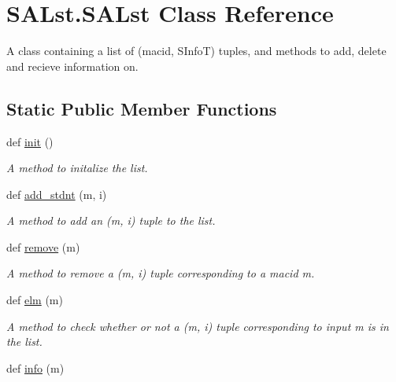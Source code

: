 \hypertarget{class_s_a_lst_1_1_s_a_lst}{}\section{S\+A\+Lst.\+S\+A\+Lst Class Reference}
\label{class_s_a_lst_1_1_s_a_lst}


A class containing a list of (\textquotesingle{}macid\textquotesingle{}, S\+InfoT) tuples, and methods to add, delete and recieve information on.  


\subsection*{Static Public Member Functions}
\begin{DoxyCompactItemize}
\item 
\mbox{\label{class_s_a_lst_1_1_s_a_lst_ac0886d79feebf875207b927b6d23a959}} 
def \mbox{\hyperlink{class_s_a_lst_1_1_s_a_lst_ac0886d79feebf875207b927b6d23a959}{init}} ()
\begin{DoxyCompactList}\small\item\em A method to initalize the list. \end{DoxyCompactList}\item 
def \mbox{\hyperlink{class_s_a_lst_1_1_s_a_lst_aa09d412a6f5562e32730d4857f7569ca}{add\+\_\+stdnt}} (m, i)
\begin{DoxyCompactList}\small\item\em A method to add an (m, i) tuple to the list. \end{DoxyCompactList}\item 
def \mbox{\hyperlink{class_s_a_lst_1_1_s_a_lst_a21390f23944739da71c78b8f684c7484}{remove}} (m)
\begin{DoxyCompactList}\small\item\em A method to remove a (m, i) tuple corresponding to a macid m. \end{DoxyCompactList}\item 
def \mbox{\hyperlink{class_s_a_lst_1_1_s_a_lst_ac2dc6bf81574e9e0e4a92be790460765}{elm}} (m)
\begin{DoxyCompactList}\small\item\em A method to check whether or not a (m, i) tuple corresponding to input m is in the list. \end{DoxyCompactList}\item 
def \mbox{\hyperlink{class_s_a_lst_1_1_s_a_lst_ad28fcb7dd27999a47ab1d074e69dfaa9}{info}} (m)

\end{DoxyCompactItemize}
